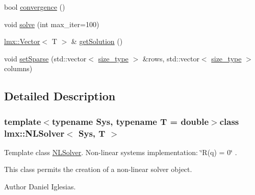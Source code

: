 \begin{DoxyCompactItemize}
\item 
bool \hyperlink{classlmx_1_1NLSolver_a152ef86802ca04b4717798855e3b0051}{convergence} ()
\item 
void \hyperlink{classlmx_1_1NLSolver_a5a62129861558b6ce4786ef85b23a232}{solve} (int max\-\_\-iter=100)
\item 
\hyperlink{classlmx_1_1Vector}{lmx\-::\-Vector}$<$ T $>$ \& \hyperlink{classlmx_1_1NLSolver_a02580887f19da89025137b9655c0735e}{get\-Solution} ()
\item 
void \hyperlink{classlmx_1_1NLSolver_a361920d06d31fe5b606bec90b946d7de}{set\-Sparse} (std\-::vector$<$ \hyperlink{lmx__mat__data_8h_a49b489a408a211a90e766329c0732d7b}{size\-\_\-type} $>$ \&rows, std\-::vector$<$ \hyperlink{lmx__mat__data_8h_a49b489a408a211a90e766329c0732d7b}{size\-\_\-type} $>$ columns)
\end{DoxyCompactItemize}


\subsection{Detailed Description}
\subsubsection*{template$<$typename Sys, typename T = double$>$class lmx\-::\-N\-L\-Solver$<$ Sys, T $>$}

Template class \hyperlink{classlmx_1_1NLSolver}{N\-L\-Solver}. Non-\/linear systems implementation\-: \char`\"{}\-R(q) = 0\char`\"{} . 

This class permits the creation of a non-\/linear solver object.

\begin{DoxyAuthor}{Author}
Daniel Iglesias. 
\end{DoxyAuthor}


